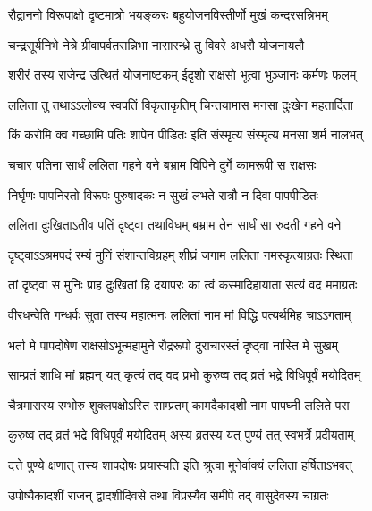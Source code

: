 \twolineshloka
{रौद्राननो विरूपाक्षो दृष्टमात्रो भयङ्करः}
{बहुयोजनविस्तीर्णो मुखं कन्दरसन्निभम्}%

\twolineshloka
{चन्द्रसूर्यनिभे नेत्रे ग्रीवापर्वतसन्निभा}
{नासारन्ध्रे तु विवरे अधरौ योजनायतौ}%

\twolineshloka
{शरीरं तस्य राजेन्द्र उत्थितं योजनाष्टकम्}
{ईदृशो राक्षसो भूत्वा भुञ्जानः कर्मणः फलम्}%

\twolineshloka
{ललिता तु तथाऽऽलोक्य स्वपतिं विकृताकृतिम्}
{चिन्तयामास मनसा दुःखेन महतार्दिता}%

\twolineshloka
{किं करोमि क्व गच्छामि पतिः शापेन पीडितः}
{इति संस्मृत्य संस्मृत्य मनसा शर्म नालभत्}%

\twolineshloka
{चचार पतिना सार्धं ललिता गहने वने}
{बभ्राम विपिने दुर्गे कामरूपी स राक्षसः}%

\twolineshloka
{निर्घृणः पापनिरतो विरूपः पुरुषादकः}
{न सुखं लभते रात्रौ न दिवा पापपीडितः}%

\twolineshloka
{ललिता दुःखिताऽतीव पतिं दृष्ट्वा तथाविधम्}
{बभ्राम तेन सार्धं सा रुदती गहने वने}%

\twolineshloka
{दृष्ट्वाऽऽश्रमपदं रम्यं मुनिं संशान्तविग्रहम्}
{शीघ्रं जगाम ललिता नमस्कृत्याग्रतः स्थिता}%

\twolineshloka
{तां दृष्ट्वा स मुनिः प्राह दुःखितां हि दयापरः}
{का त्वं कस्मादिहायाता सत्यं वद ममाग्रतः}%


\twolineshloka
{वीरधन्वेति गन्धर्वः सुता तस्य महात्मनः}
{ललितां नाम मां विद्धि पत्यर्थमिह चाऽऽगताम्}%

\twolineshloka
{भर्ता मे पापदोषेण राक्षसोऽभून्महामुने}
{रौद्ररूपो दुराचारस्तं दृष्ट्वा नास्ति मे सुखम्}%

\twolineshloka
{साम्प्रतं शाधि मां ब्रह्मन् यत् कृत्यं तद् वद प्रभो}
{कुरुष्व तद् व्रतं भद्रे विधिपूर्वं मयोदितम्}%


\twolineshloka
{चैत्रमासस्य रम्भोरु शुक्लपक्षोऽस्ति साम्प्रतम्}
{कामदैकादशी नाम पापघ्नी ललिते परा}%

\twolineshloka
{कुरुष्व तद् व्रतं भद्रे विधिपूर्वं मयोदितम्}
{अस्य व्रतस्य यत् पुण्यं तत् स्वभर्त्रे प्रदीयताम्}%

\twolineshloka
{दत्ते पुण्ये क्षणात् तस्य शापदोषः प्रयास्यति}
{इति श्रुत्वा मुनेर्वाक्यं ललिता हर्षिताऽभवत्}%

\twolineshloka
{उपोष्यैकादशीं राजन् द्वादशीदिवसे तथा}
{विप्रस्यैव समीपे तद् वासुदेवस्य चाग्रतः}%

